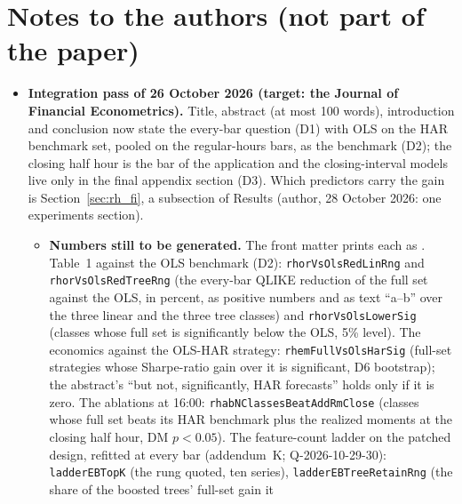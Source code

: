 \section{Notes to the authors (not part of the paper)}
\begin{itemize}
\item \textbf{Integration pass of 26 October 2026 (target: the Journal of Financial Econometrics).} Title, abstract
  (at most 100 words), introduction and conclusion now state the every-bar question (D1) with OLS on the HAR benchmark
  set, pooled on the regular-hours bars, as the benchmark (D2); the closing half hour is the bar of the application
  and the closing-interval models live only in the final appendix section (D3). Which predictors carry the gain is
  Section~\ref{sec:rh_fi}, a subsection of Results (author, 28 October 2026: one experiments section).
  \begin{itemize}
  \iffalse
  \item \textbf{Numbers still to be generated.} The front matter prints each as . Table~1 against the
    OLS benchmark (D2): \texttt{rhorVsOlsRedLinRng} and \texttt{rhorVsOlsRedTreeRng} (the every-bar QLIKE reduction
    of the full set against the OLS, in percent, as positive numbers and as text ``a--b'' over the three linear and
    the three tree classes) and \texttt{rhorVsOlsLowerSig} (classes whose full set is significantly below the OLS,
    5\% level). The economics against the OLS-HAR strategy: \texttt{rhemFullVsOlsHarSig} (full-set strategies whose
    Sharpe-ratio gain over it is significant, D6 bootstrap); the abstract's ``but not, significantly, HAR forecasts''
    holds only if it is zero. The ablations at 16:00: \texttt{rhabNClassesBeatAddRmClose} (classes whose full set
    beats its HAR benchmark plus the realized moments at the closing half hour, DM $p < 0.05$). The feature-count
    ladder on the patched design, refitted at every bar (addendum~K; Q-2026-10-29-30): \texttt{ladderEBTopK} (the
    rung quoted, ten series), \texttt{ladderEBTreeRetainRng} (the share of the boosted trees' full-set gain it

\end{itemize}
\end{itemize}
